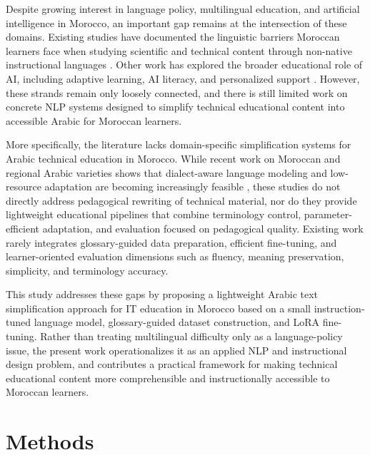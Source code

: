 \documentclass[education,article,submit,moreauthors]{Definitions/mdpi}
\begin{document}
Despite growing interest in language policy, multilingual education, and artificial intelligence in Morocco, an important gap remains at the intersection of these domains. Existing studies have documented the linguistic barriers Moroccan learners face when studying scientific and technical content through non-native instructional languages \citep{Ichou2022PromotingQuality,Jarmouni2024ImpactInstructionLanguage,Ouchaib2021LanguageInstructionScience,Mohammed2024LanguagePolicyDisturbances}. Other work has explored the broader educational role of AI, including adaptive learning, AI literacy, and personalized support \citep{Alqahtani2023EmergentRoleAI,Gutierrez2023AILanguageEducation,RE2024RevolutionizingEducationAI,Ismaili2024AILiteracyAdaptiveLearning}. However, these strands remain only loosely connected, and there is still limited work on concrete NLP systems designed to simplify technical educational content into accessible Arabic for Moroccan learners.

More specifically, the literature lacks domain-specific simplification systems for Arabic technical education in Morocco. While recent work on Moroccan and regional Arabic varieties shows that dialect-aware language modeling and low-resource adaptation are becoming increasingly feasible \citep{Shang2024AtlasChat,Skiredj2025GemMaroc,Mahdi2025TunisianArabicLLMs,Aryan2024ResourceAwareArabicLLM}, these studies do not directly address pedagogical rewriting of technical material, nor do they provide lightweight educational pipelines that combine terminology control, parameter-efficient adaptation, and evaluation focused on pedagogical quality. Existing work rarely integrates glossary-guided data preparation, efficient fine-tuning, and learner-oriented evaluation dimensions such as fluency, meaning preservation, simplicity, and terminology accuracy.

This study addresses these gaps by proposing a lightweight Arabic text simplification approach for IT education in Morocco based on a small instruction-tuned language model, glossary-guided dataset construction, and LoRA fine-tuning. Rather than treating multilingual difficulty only as a language-policy issue, the present work operationalizes it as an applied NLP and instructional design problem, and contributes a practical framework for making technical educational content more comprehensible and instructionally accessible to Moroccan learners.

\section{Methods}
\end{document}
